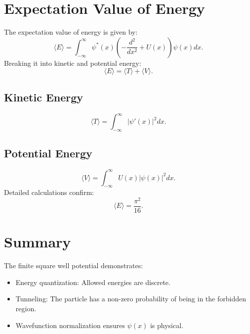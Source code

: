 \documentclass[a4paper,12pt]{article}
\begin{document}
\begin{multicols}{2}
\section{Expectation Value of Energy}
The expectation value of energy is given by:
\[
\langle E \rangle = \int_{-\infty}^\infty \psi^*(x)\left(-\frac{d^2}{dx^2} + U(x)\right)\psi(x) dx.
\]
Breaking it into kinetic and potential energy:
\[
\langle E \rangle = \langle T \rangle + \langle V \rangle.
\]

\subsection{Kinetic Energy}
\[
\langle T \rangle = \int_{-\infty}^\infty |\psi'(x)|^2 dx.
\]
\subsection{Potential Energy}
\[
\langle V \rangle = \int_{-\infty}^\infty U(x)|\psi(x)|^2 dx.
\]
Detailed calculations confirm:
\[
\langle E \rangle = \frac{\pi^2}{16}.
\]

\section{Summary}
The finite square well potential demonstrates:
\begin{itemize}
    \item Energy quantization: Allowed energies are discrete.
    \item Tunneling: The particle has a non-zero probability of being in the forbidden region.
    \item Wavefunction normalization ensures \( \psi(x) \) is physical.
\end{itemize}

\end{multicols}
\end{document}
